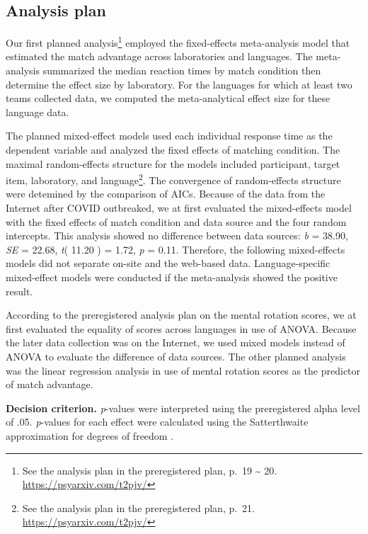 \documentclass[
  man,floatsintext]{apa6}
\begin{document}
\hypertarget{analysis-plan}{%
\subsection{Analysis plan}\label{analysis-plan}}

Our first planned analysis\footnote{See the analysis plan in the preregistered plan, p.~19 \textasciitilde{} 20. \url{https://psyarxiv.com/t2pjv/}} employed the fixed-effects meta-analysis model that estimated the match advantage across laboratories and languages. The meta-analysis summarized the median reaction times by match condition then determine the effect size by laboratory. For the languages for which at least two teams collected data, we computed the meta-analytical effect size for these language data.

The planned mixed-effect models used each individual response time as the dependent variable and analyzed the fixed effects of matching condition. The maximal random-effects structure for the models included participant, target item, laboratory, and language\footnote{See the analysis plan in the preregistered plan, p.~21. \url{https://psyarxiv.com/t2pjv/}}. The convergence of random-effects structure were detemined by the comparison of AICs. Because of the data from the Internet after COVID outbreaked, we at first evaluated the mixed-effects model with the fixed effects of match condition and data source and the four random intercepts. This analysis showed no difference between data sources: \emph{b} = 38.90, \emph{SE} = 22.68, \emph{t}( 11.20 ) = 1.72, \emph{p} = 0.11. Therefore, the following mixed-effects models did not separate on-site and the web-based data. Language-specific mixed-effect models were conducted if the meta-analysis showed the positive result.

According to the preregistered analysis plan on the mental rotation scores, we at first evaluated the equality of scores across languages in use of ANOVA. Because the later data collection was on the Internet, we used mixed models instead of ANOVA to evaluate the difference of data sources. The other planned analysis was the linear regression analysis in use of mental rotation scores as the predictor of match advantage.

\textbf{Decision criterion.} \emph{p}-values were interpreted using the preregistered alpha level of .05. \emph{p}-values for each effect were calculated using the Satterthwaite approximation for degrees of freedom \autocite{lukeEvaluatingSignificanceLinear2017}.
\end{document}
